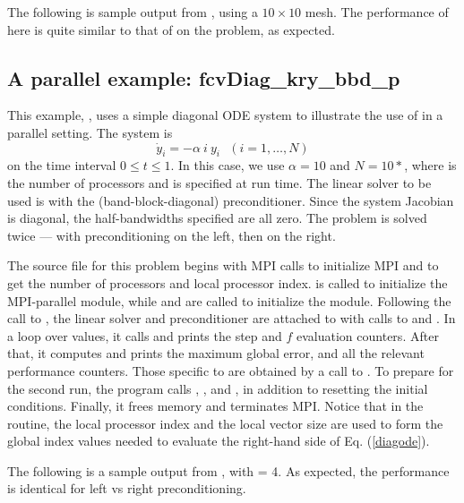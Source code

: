 The following is sample output from , using a $10 \times 10$ mesh.
The performance of {\fcvode} here is quite similar to that of {\cvode} on
the  problem, as expected.



\subsection{A parallel example: fcvDiag\_kry\_bbd\_p}\label{ss:fcvDiag_bbd_p}

This example, , uses a simple diagonal ODE system to illustrate
the use of {\fcvode} in a parallel setting.  The system is
\begin{equation} \label{diagode}
\dot{y}_i = - \alpha ~i~ y_i ~~~ (i = 1,\ldots, N)
\end{equation}
on the time interval $0 \leq t \leq 1$.  In this case, we use $\alpha = 10$
and $N = 10*$, where  is the number of processors
and is specified at run time.  The linear solver to be used is
{\spgmr} with the {\cvbbdpre} (band-block-diagonal) preconditioner.
Since the system Jacobian is diagonal, the half-bandwidths specified
are all zero.  The problem is solved twice --- with preconditioning on
the left, then on the right.

The source file for this problem begins with MPI calls to initialize
MPI and to get the number of processors and local processor index.
 is called to initialize the MPI-parallel {\nvector}
module, while  and  are
called to initialize the {\spgmr} {\sunlinsol} module.
Following the call to , the linear solver and
preconditioner are attached to {\cvode} with calls to
 and .  In a loop over  
values, it calls  and prints the step and $f$ evaluation counters.
After that, it computes and prints the maximum global error, and all the
relevant performance counters.  Those specific to {\cvbbdpre} are obtained
by a call to .  To prepare for the second run, the program
calls , , and , 
in addition to resetting the initial conditions.  Finally, it frees
memory and terminates MPI. Notice that in the  routine, the
local processor index  and the local vector size 
are used to form the global index values needed to evaluate the
right-hand side of Eq. (\ref{diagode}). 

The following is a sample output from , with  = 4.
As expected, the performance is identical for left vs right preconditioning.


